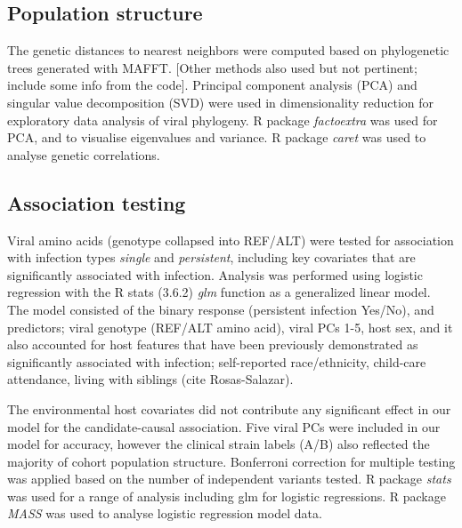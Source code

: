 \documentclass{article}
\begin{document}
\subsection{Population structure}
The genetic distances to nearest neighbors were computed based on phylogenetic 
trees generated with MAFFT.
[Other methods also used but not pertinent; include some info from the code].
Principal component analysis (PCA) and singular value decomposition (SVD) were used in dimensionality reduction for exploratory data analysis of viral phylogeny.
R package \textit{factoextra} was used for PCA, and to visualise eigenvalues and variance. 
R package \textit{caret} was used to analyse genetic correlations.

\subsection{Association testing}
Viral amino acids (genotype collapsed into REF/ALT) were tested for association with infection types \textit{single} and \textit{persistent}, 
including key covariates that are significantly associated with infection.
Analysis was performed using logistic regression with the
R stats (3.6.2) \textit{glm} function as a generalized linear model.
The model consisted of the binary response (persistent infection Yes/No), and predictors; viral genotype (REF/ALT amino acid), viral PCs 1-5, host sex, and it also accounted for host features that have been previously demonstrated as significantly associated with infection; 
self-reported race/ethnicity, child-care attendance, living with siblings (cite Rosas-Salazar).


The environmental host covariates did not contribute any significant effect in our model for the candidate-causal association.
Five viral PCs were included in our model for accuracy, however the clinical 
strain labels (A/B) also reflected the majority of cohort population structure.
Bonferroni correction for multiple testing was applied based on the number of independent variants tested.
R package \textit{stats} was used for a range of analysis including glm for logistic regressions. 
R package \textit{MASS} was used to analyse logistic regression model data.
\end{document}
